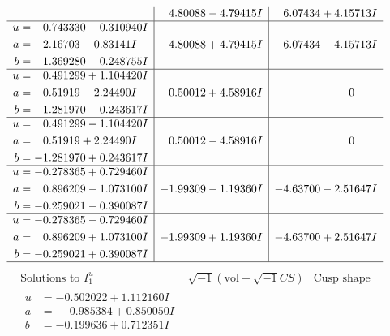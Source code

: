 \documentclass[1p]{elsarticle_modified}
\theoremstyle{definition}
\newcommand{\I}{\sqrt{-1}}
\begin{document}
$$\begin{array}{c|c|c}
 & \phantom{-}4.80088 - 4.79415 I & \phantom{-}6.07434 + 4.15713 I \\ \hline\begin{aligned}
u &= \phantom{-}0.743330 - 0.310940 I \\
a &= \phantom{-}2.16703 - 0.83141 I \\
b &= -1.369280 - 0.248755 I\end{aligned}
 & \phantom{-}4.80088 + 4.79415 I & \phantom{-}6.07434 - 4.15713 I \\ \hline\begin{aligned}
u &= \phantom{-}0.491299 + 1.104420 I \\
a &= \phantom{-}0.51919 - 2.24490 I \\
b &= -1.281970 - 0.243617 I\end{aligned}
 & \phantom{-}0.50012 + 4.58916 I & \phantom{-0.000000 } 0 \\ \hline\begin{aligned}
u &= \phantom{-}0.491299 - 1.104420 I \\
a &= \phantom{-}0.51919 + 2.24490 I \\
b &= -1.281970 + 0.243617 I\end{aligned}
 & \phantom{-}0.50012 - 4.58916 I & \phantom{-0.000000 } 0 \\ \hline\begin{aligned}
u &= -0.278365 + 0.729460 I \\
a &= \phantom{-}0.896209 - 1.073100 I \\
b &= -0.259021 - 0.390087 I\end{aligned}
 & -1.99309 - 1.19360 I & -4.63700 - 2.51647 I \\ \hline\begin{aligned}
u &= -0.278365 - 0.729460 I \\
a &= \phantom{-}0.896209 + 1.073100 I \\
b &= -0.259021 + 0.390087 I\end{aligned}
 & -1.99309 + 1.19360 I & -4.63700 + 2.51647 I\\
 \hline 
 \end{array}$$\newpage$$\begin{array}{c|c|c}  
\text{Solutions to }I^u_{1}& \I (\text{vol} + \sqrt{-1}CS) & \text{Cusp shape}\\
 \hline 
\begin{aligned}
u &= -0.502022 + 1.112160 I \\
a &= \phantom{-}0.985384 + 0.850050 I \\
b &= -0.199636 + 0.712351 I\end{aligned}

\end{array}$$
\end{document}
